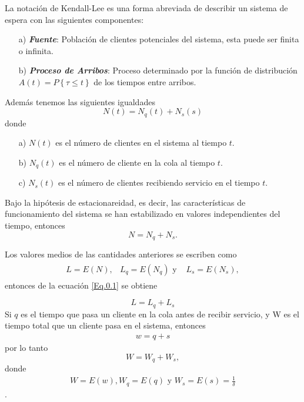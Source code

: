 \documentclass{article}
\numberwithin{equation}{section}
\begin{document}
La notaci\'on de Kendall-Lee es una forma abreviada de describir un sistema de espera con las siguientes componentes:
\begin{itemize}
\item[a)] {\em\bf Fuente}: Poblaci\'on de clientes potenciales del sistema, esta puede ser finita o infinita. 
\item[b)] {\em\bf Proceso de Arribos}: Proceso determinado por la funci\'on de distribuci\'on $A\left(t\right)=P\left\{\tau\leq t\right\}$ de los tiempos entre arribos.
\end{itemize}

Adem\'as tenemos las siguientes igualdades
\begin{equation}\label{Eq.0.1}
N\left(t\right)=N_{q}\left(t\right)+N_{s}\left(s\right)
\end{equation}
donde
\begin{itemize}
\item[a) ] $N\left(t\right)$ es el n\'umero de clientes en el sistema al tiempo $t$. 
\item[b) ] $N_{q}\left(t\right)$ es el n\'umero de cliente en la cola al tiempo $t$.
\item[c) ] $N_{s}\left(t\right)$ es el n\'umero de clientes recibiendo servicio en el tiempo $t$.
\end{itemize}

Bajo la hip\'otesis de estacionareidad, es decir, las caracter\'isticas de funcionamiento del sistema se han estabilizado en valores independientes del tiempo, entonces
\begin{equation}
N=N_{q}+N_{s}.
\end{equation}

Los valores medios de las cantidades anteriores se escriben como 
\begin{eqnarray}
\begin{array}{ccc}
L=E\left(N\right), &L_{q}=E\left(N_{q}\right)\textrm{ y }&L_{s}=E\left(N_{s}\right),
\end{array}
\end{eqnarray}
entonces de la ecuaci\'on \ref{Eq.0.1} se obtiene

\begin{equation}
L=L_{q}+L_{s}
\end{equation}
Si $q$ es el tiempo que pasa un cliente en la cola antes de recibir servicio, y W es el tiempo total que un cliente pasa en el sistema, entonces \begin{eqnarray*}w=q+s\end{eqnarray*} por lo tanto 
\begin{equation}W=W_{q}+W_{s},\end{equation} donde \begin{eqnarray*}W=E\left(w\right), W_{q}=E\left(q\right)\textrm{ y }W_{s}=E\left(s\right)=\frac{1}{\delta}\end{eqnarray*}.
\end{document}
